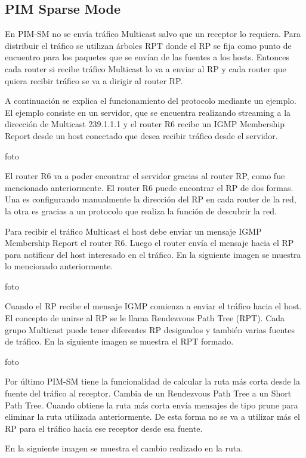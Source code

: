\documentclass[12pt,a4paper,oneside]{book}
\begin{document}
\subsection{PIM Sparse Mode}
\label{pimsm}

En PIM-SM no se envía tráfico Multicast salvo que un receptor lo requiera. Para distribuir el tráfico se utilizan árboles RPT donde el RP se fija como punto de encuentro para los paquetes que se envían de las fuentes a los hosts. Entonces cada router si recibe tráfico Multicast lo va a enviar al RP y cada router que quiera recibir tráfico se va a dirigir al router RP.

	A continuación se explica el funcionamiento del protocolo mediante un ejemplo. El ejemplo consiste en un servidor, que se encuentra realizando streaming a la dirección de Multicast 239.1.1.1 y el router R6 recibe un IGMP Membership Report desde un host conectado que desea recibir tráfico desde el servidor.

foto

El router R6 va a poder encontrar el servidor gracias al router RP, como fue mencionado anteriormente. El router R6 puede encontrar el RP de dos formas. Una es configurando manualmente la dirección del RP en cada router de la red, la otra es gracias a un protocolo que realiza la función de descubrir la red.  
	
Para recibir el tráfico Multicast el host debe enviar un mensaje IGMP Membership Report el router R6. Luego el router envía el mensaje hacia el RP para notificar del host interesado en el tráfico. En la siguiente imagen se muestra lo mencionado anteriormente.

foto

Cuando el RP recibe el mensaje IGMP comienza a enviar el tráfico hacia el host. El concepto de unirse al RP se le llama Rendezvous Path Tree (RPT). Cada grupo Multicast puede tener diferentes RP designados y también varias fuentes de tráfico. En la siguiente imagen se muestra el RPT formado.

foto

Por último PIM-SM tiene la funcionalidad de calcular la ruta más corta desde la fuente del tráfico al receptor. Cambia de un Rendezvous Path Tree a un Short Path Tree. Cuando obtiene la ruta más corta envía mensajes de tipo prune para eliminar la ruta utilizada anteriormente. De esta forma no se va a utilizar más el RP para el tráfico hacia ese receptor desde esa fuente.

En la siguiente imagen se muestra el cambio realizado en la ruta.
\end{document}
